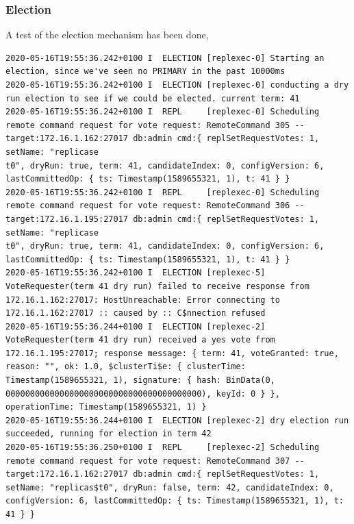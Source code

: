 \documentclass[11pt]{article}
\begin{document}
\subsubsection{Election}
A test of the election mechanism has been done,
\begin{lstlisting}[language={}, basicstyle=\small]
2020-05-16T19:55:36.242+0100 I  ELECTION [replexec-0] Starting an election, since we've seen no PRIMARY in the past 10000ms                                                                                        
2020-05-16T19:55:36.242+0100 I  ELECTION [replexec-0] conducting a dry run election to see if we could be elected. current term: 41                                                                                
2020-05-16T19:55:36.242+0100 I  REPL     [replexec-0] Scheduling remote command request for vote request: RemoteCommand 305 -- target:172.16.1.162:27017 db:admin cmd:{ replSetRequestVotes: 1, setName: "replicase
t0", dryRun: true, term: 41, candidateIndex: 0, configVersion: 6, lastCommittedOp: { ts: Timestamp(1589655321, 1), t: 41 } }                                                                                       
2020-05-16T19:55:36.242+0100 I  REPL     [replexec-0] Scheduling remote command request for vote request: RemoteCommand 306 -- target:172.16.1.195:27017 db:admin cmd:{ replSetRequestVotes: 1, setName: "replicase
t0", dryRun: true, term: 41, candidateIndex: 0, configVersion: 6, lastCommittedOp: { ts: Timestamp(1589655321, 1), t: 41 } }                                                                                       
2020-05-16T19:55:36.242+0100 I  ELECTION [replexec-5] VoteRequester(term 41 dry run) failed to receive response from 172.16.1.162:27017: HostUnreachable: Error connecting to 172.16.1.162:27017 :: caused by :: C$nnection refused
2020-05-16T19:55:36.244+0100 I  ELECTION [replexec-2] VoteRequester(term 41 dry run) received a yes vote from 172.16.1.195:27017; response message: { term: 41, voteGranted: true, reason: "", ok: 1.0, $clusterTi$e: { clusterTime: Timestamp(1589655321, 1), signature: { hash: BinData(0, 0000000000000000000000000000000000000000), keyId: 0 } }, operationTime: Timestamp(1589655321, 1) }
2020-05-16T19:55:36.244+0100 I  ELECTION [replexec-2] dry election run succeeded, running for election in term 42
2020-05-16T19:55:36.250+0100 I  REPL     [replexec-2] Scheduling remote command request for vote request: RemoteCommand 307 -- target:172.16.1.162:27017 db:admin cmd:{ replSetRequestVotes: 1, setName: "replicas$t0", dryRun: false, term: 42, candidateIndex: 0, configVersion: 6, lastCommittedOp: { ts: Timestamp(1589655321, 1), t: 41 } }

\end{lstlisting}
\end{document}
